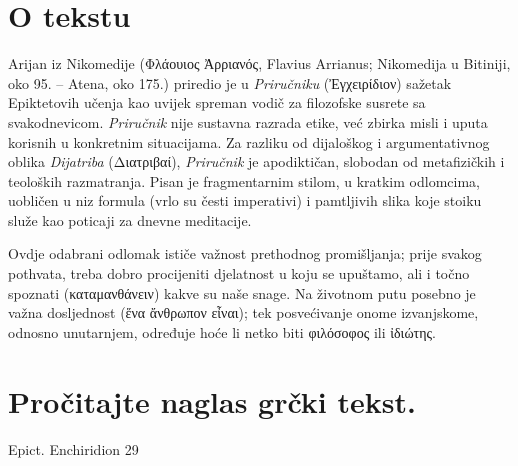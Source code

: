 


\section*{O tekstu}

Arijan iz Nikomedije \textgreek[variant=ancient]{(Φλάουιος Ἀρριανός,} Flavius Arrianus; Nikomedija u Bitiniji, oko 95. – Atena, oko 175.) priredio je u \textit{Priručniku} \textgreek[variant=ancient]{(Ἐγχειρίδιον)} sažetak Epiktetovih učenja kao uvijek spreman vodič za filozofske susrete sa svakodnevicom. \textit{Priručnik} nije sustavna razrada etike, već zbirka misli i uputa korisnih u konkretnim situacijama. Za razliku od dijaloškog i argumentativnog oblika \textit{Dijatriba} \textgreek[variant=ancient]{(Διατριβαί),} \textit{Priručnik} je apodiktičan, slobodan od metafizičkih i teoloških razmatranja. Pisan je fragmentarnim stilom, u kratkim odlomcima, uobličen u niz formula (vrlo su česti imperativi) i pamtljivih slika koje stoiku služe kao poticaji za dnevne meditacije.

Ovdje odabrani odlomak ističe važnost prethodnog promišljanja; prije svakog pothvata, treba dobro procijeniti djelatnost u koju se upuštamo, ali i točno spoznati \textgreek[variant=ancient]{(καταμανθάνειν)} kakve su naše snage. Na životnom putu posebno je važna dosljednost \textgreek[variant=ancient]{(ἕνα ἄνθρωπον εἶναι)}; tek posvećivanje onome izvanjskome, odnosno unutarnjem, određuje hoće li netko biti \textgreek[variant=ancient]{φιλόσοφος} ili \textgreek[variant=ancient]{ἰδιώτης.}

\newpage

\section*{Pročitajte naglas grčki tekst.}

Epict. Enchiridion 29


\medskip


